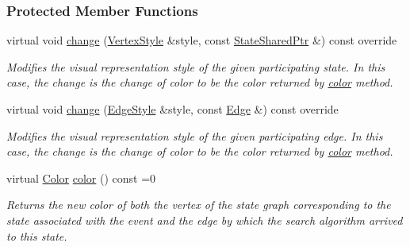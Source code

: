 \subsubsection*{Protected Member Functions}
\begin{DoxyCompactItemize}
\item 
virtual void \hyperlink{structVertexEdgeColor_af4433966ab478e070092eaa3af83f19e}{change} (\hyperlink{structVertexStyle}{Vertex\+Style} \&style, const \hyperlink{structEventBase_a2c0edb5cda08ce1965f3440a97b3fc87}{State\+Shared\+Ptr} \&) const override\hypertarget{structVertexEdgeColor_af4433966ab478e070092eaa3af83f19e}{}\label{structVertexEdgeColor_af4433966ab478e070092eaa3af83f19e}

\begin{DoxyCompactList}\small\item\em Modifies the visual representation style of the given participating state. In this case, the change is the change of color to be the color returned by \hyperlink{structVertexEdgeColor_a99176519d2fbdb86b77dfd80b9ed47cb}{color} method. \end{DoxyCompactList}\item 
virtual void \hyperlink{structVertexEdgeColor_a7323b371c4a5c3ae774b45bc2ec554e9}{change} (\hyperlink{structEdgeStyle}{Edge\+Style} \&style, const \hyperlink{structUniformChange_a34b7655a38ac1deb98a5978cb1ad5cf6}{Edge} \&) const override\hypertarget{structVertexEdgeColor_a7323b371c4a5c3ae774b45bc2ec554e9}{}\label{structVertexEdgeColor_a7323b371c4a5c3ae774b45bc2ec554e9}

\begin{DoxyCompactList}\small\item\em Modifies the visual representation style of the given participating edge. In this case, the change is the change of color to be the color returned by \hyperlink{structVertexEdgeColor_a99176519d2fbdb86b77dfd80b9ed47cb}{color} method. \end{DoxyCompactList}\item 
virtual \hyperlink{colors_8h_ab87bacfdad76e61b9412d7124be44c1c}{Color} \hyperlink{structVertexEdgeColor_a99176519d2fbdb86b77dfd80b9ed47cb}{color} () const =0
\begin{DoxyCompactList}\small\item\em Returns the new color of both the vertex of the state graph corresponding to the state associated with the event and the edge by which the search algorithm arrived to this state. \end{DoxyCompactList}\end{DoxyCompactItemize}
